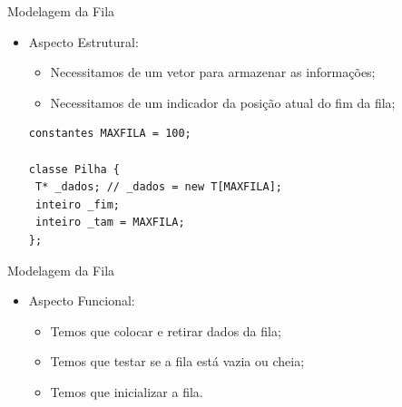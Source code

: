 \documentclass[12pt,table,xcolor={dvipsnames}]{beamer}
\begin{document}
\begin{frame}[fragile]{Modelagem da Fila}

\begin{itemize}
\item Aspecto Estrutural:
\begin{itemize}
\item Necessitamos de um vetor para armazenar as informações;
\item Necessitamos de um indicador da posição atual do fim da fila;
\end{itemize}
\begin{lstlisting}
constantes MAXFILA = 100;

classe Pilha {
 T* _dados; // _dados = new T[MAXFILA];
 inteiro _fim;
 inteiro _tam = MAXFILA;        
};
\end{lstlisting}
\end{itemize}
\end{frame}

\begin{frame}[fragile]{Modelagem da Fila}

\begin{itemize}
\item Aspecto Funcional:
\begin{itemize}
\item Temos que colocar e retirar dados da fila;
\item Temos que testar se a fila está vazia ou cheia;
\item Temos que inicializar a fila.
\end{itemize}
\end{itemize}
\end{frame}
\end{document}
